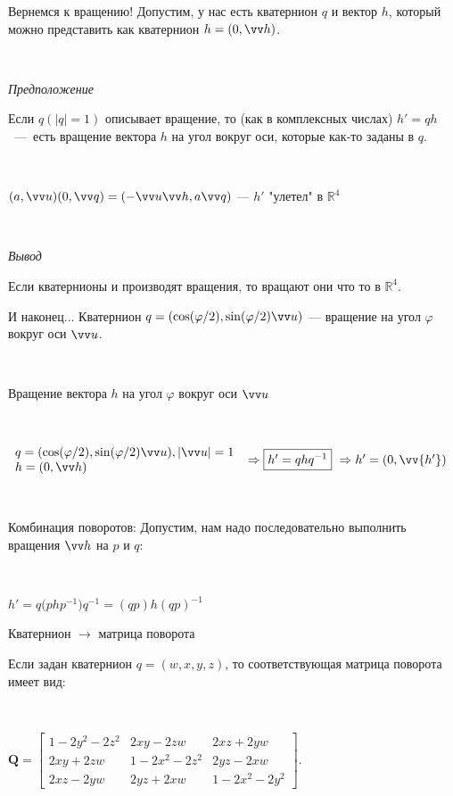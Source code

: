 \documentclass[10pt]{beamer}
\begin{document}
	\begin{frame}{Вернемся к вращению!}
		Допустим, у нас есть кватернион $q$ и вектор $h$, который можно представить как кватернион $h=(0,\vv h)$.
		
		~
		
		\textit{Предположение}
		
		Если $q (|q|=1)$ описывает вращение, то (как в комплексных числах) $h'=qh$~---~есть вращение вектора $h$ на угол вокруг оси, которые как-то заданы в $q$.
		
		~\pause
		
		$(a,\vv u)(0,\vv q) = (-\vv u \vv h, a\vv q)$ --- $h'$ "улетел"  в $\mathbb R^4$
		
		~\pause
		
		\textit{Вывод}
		
		Если кватернионы и производят вращения, то вращают они что то в $\mathbb R^4$.
		
	\end{frame}
	
	
	\begin{frame}{И наконец...}
		Кватернион $q=(\cos(\varphi/2), \sin(\varphi/2) \vv u)$ --- вращение на угол $\varphi$ вокруг оси $\vv u$.
		
		~
		
		\begin{block}{Вращение вектора $h$ на угол $\varphi$ вокруг оси $\vv u$ }
		\centering
		
		~
		
		$
		\begin{array}{l}
			q=(\cos(\varphi/2), \sin(\varphi/2) \vv u), |\vv u|=1\\
			h=(0,\vv h)
		\end{array}
		\ \Rightarrow
		\fbox{$h'=qhq^{-1}$}
		\ \Rightarrow
		h'=(0,\vv {h'})
		$
		\end{block}
		
				
		~
		
		Комбинация поворотов:
		Допустим, нам надо последовательно выполнить вращения  $\vv h$ на $p$ и $q$:
		
		~
		
		$h'=q\big(php^{-1}\big)q^{-1}=(qp)h(qp)^{-1}$
		
	\end{frame}
	

	
	
	\begin{frame}{Кватернион $\rightarrow$ матрица поворота}
		
		Если задан кватернион 
		$q=(w,x,y,z)$, то соответствующая матрица поворота имеет вид:
		
		~
		
		\centering
		$\mathbf Q = \begin{bmatrix}
			1 - 2 y^2 - 2 z^2 & 2 x y - 2 z w & 2 x z + 2 y w \\
			2 x y + 2 z w & 1 - 2 x^2 - 2 z^2 & 2 y z - 2 x w \\
			2 x z - 2 y w & 2 y z + 2 x w & 1 - 2 x^2 - 2 y^2
		\end{bmatrix} .$
	\end{frame}
	
\end{document}
